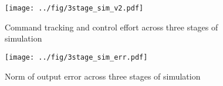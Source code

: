 \documentclass[english]{IEEEtran}
\begin{document}
\begin{figure}[htbp]
	\centering
	\texttt{[image: ../fig/3stage\_sim\_v2.pdf]}
	\caption{Command tracking and control effort across three stages of simulation}
	\label{fig:sim}
\end{figure}

\begin{figure}[htbp]
	\centering
	\texttt{[image: ../fig/3stage\_sim\_err.pdf]}
	\caption{Norm of output error across three stages of simulation}
	\label{fig:err}
\end{figure}




\end{document}
